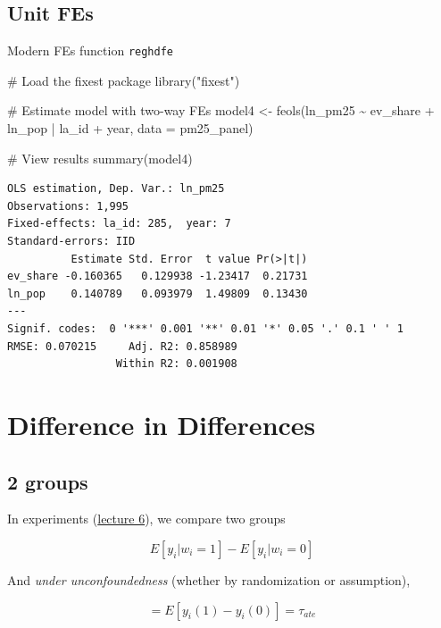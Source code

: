 \documentclass[
  letterpaper,
  DIV=11,
  numbers=noendperiod]{scrartcl}
\newenvironment{Shaded}{\begin{snugshade}}{\end{snugshade}}
\newcommand{\AttributeTok}[1]{\textcolor[rgb]{0.40,0.45,0.13}{#1}}
\newcommand{\CommentTok}[1]{\textcolor[rgb]{0.37,0.37,0.37}{#1}}
\newcommand{\FunctionTok}[1]{\textcolor[rgb]{0.28,0.35,0.67}{#1}}
\newcommand{\NormalTok}[1]{\textcolor[rgb]{0.00,0.23,0.31}{#1}}
\newcommand{\OtherTok}[1]{\textcolor[rgb]{0.00,0.23,0.31}{#1}}
\newcommand{\SpecialCharTok}[1]{\textcolor[rgb]{0.37,0.37,0.37}{#1}}
\newcommand{\StringTok}[1]{\textcolor[rgb]{0.13,0.47,0.30}{#1}}
\begin{document}
\subsection{Unit FEs}\label{unit-fes-1}

Modern FEs function \texttt{reghdfe}

\begin{Shaded}
\begin{Highlighting}[]
\CommentTok{\# Load the fixest package}
\FunctionTok{library}\NormalTok{(}\StringTok{"fixest"}\NormalTok{)}

\CommentTok{\# Estimate model with two{-}way FEs}
\NormalTok{model4 }\OtherTok{\textless{}{-}} \FunctionTok{feols}\NormalTok{(ln\_pm25 }\SpecialCharTok{\textasciitilde{}}\NormalTok{ ev\_share }\SpecialCharTok{+}\NormalTok{ ln\_pop }\SpecialCharTok{|}\NormalTok{ la\_id }\SpecialCharTok{+}\NormalTok{ year, }\AttributeTok{data =}\NormalTok{ pm25\_panel)}

\CommentTok{\# View results}
\FunctionTok{summary}\NormalTok{(model4)}
\end{Highlighting}
\end{Shaded}

\begin{verbatim}
OLS estimation, Dep. Var.: ln_pm25
Observations: 1,995
Fixed-effects: la_id: 285,  year: 7
Standard-errors: IID 
          Estimate Std. Error  t value Pr(>|t|) 
ev_share -0.160365   0.129938 -1.23417  0.21731 
ln_pop    0.140789   0.093979  1.49809  0.13430 
---
Signif. codes:  0 '***' 0.001 '**' 0.01 '*' 0.05 '.' 0.1 ' ' 1
RMSE: 0.070215     Adj. R2: 0.858989
                 Within R2: 0.001908
\end{verbatim}

\section{Difference in Differences}\label{difference-in-differences}

\subsection{2 groups}\label{groups}

In experiments (\href{lecture-6-multi.qmd}{lecture 6}), we compare two
groups

\[
  E[y_i | w_i =1]-E[y_i|w_i=0]
\]

And \emph{under unconfoundedness} (whether by randomization or
assumption),

\[
  =E[y_i(1)-y_i(0)] = \tau_{ate}
\]
\end{document}
